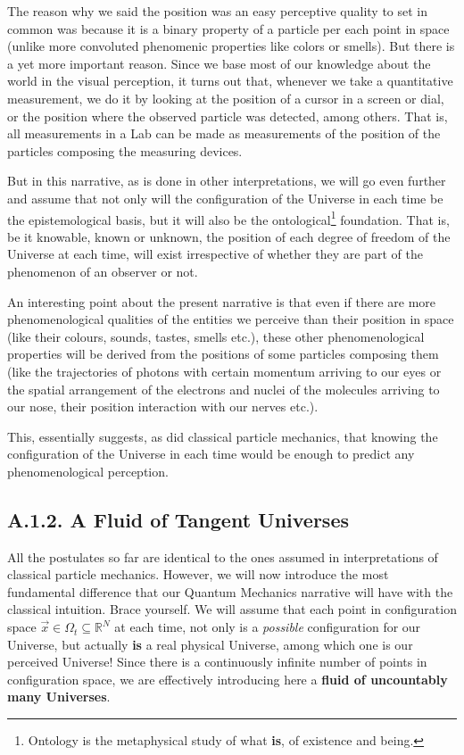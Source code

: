 \documentclass[11pt, a4paper]{article} %
\newcommand{\R}{\mathbb{R}} %
\DeclareRobustCommand{\mybox}[2][gray!10]{%
\begin{tcolorbox}[   %
        left=0.2cm,
        right=0.2cm,
        top=0.15cm,
        bottom=0.15cm,
        colback=#1,
        colframe=#1,
        width=\dimexpr\textwidth\relax, 
        enlarge left by=0mm,
        boxsep=5pt,
        arc=0pt,outer arc=0pt,
        ]
        #2
\end{tcolorbox}
}
\begin{document}
The reason why we said the position was an easy perceptive quality to set in common was because it is a binary property of a particle per each point in space (unlike more convoluted phenomenic properties like colors or smells). But there is a yet more important reason. Since we base most of our knowledge about the world in the visual perception, it turns out that, whenever we take a quantitative measurement, we do it by looking at the position of a cursor in a screen or dial, or the position where the observed particle was detected, among others. That is, all measurements in a Lab can be made as measurements of the position of the particles composing the measuring devices.

But in this narrative, as is done in other interpretations, we will go even further and assume that not only will the configuration of the Universe in each time be the epistemological basis, but it will also be the ontological\footnote{Ontology is the metaphysical study of what {\bf is}, of existence and being.} foundation. That is, be it knowable, known or unknown, the position of each degree of freedom of the Universe at each time, will exist irrespective of whether they are part of the phenomenon of an observer or not.\vspace{-0.1cm}

\mybox{
An interesting point about the present narrative is that even if there are more phenomenological qualities of the entities we perceive than their position in space (like their colours, sounds, tastes, smells etc.), these other phenomenological properties will be derived from the positions of some particles composing them (like the trajectories of photons with certain momentum arriving to our eyes or the spatial arrangement of the electrons and nuclei of the molecules arriving to our nose, their position interaction with our nerves etc.).} 
\mybox{
This, essentially suggests, as did classical particle mechanics, that knowing the configuration of the Universe in each time would be enough to predict any phenomenological perception.
}

\subsection*{A.1.2. A Fluid of Tangent Universes}

All the postulates so far are identical to the ones assumed in interpretations of classical particle mechanics. However, we will now introduce the most fundamental difference that our Quantum Mechanics narrative will have with the classical intuition. Brace yourself. We will assume that each point in configuration space $\vec{x}\in\Omega_t\subseteq\R^N$ at each time, not only is a {\em possible} configuration for our Universe, but actually {\bf is} a real physical Universe, among which one is our perceived Universe! Since there is a continuously infinite number of points in configuration space, we are effectively introducing here a {\bf fluid of uncountably many Universes}.
\end{document}
